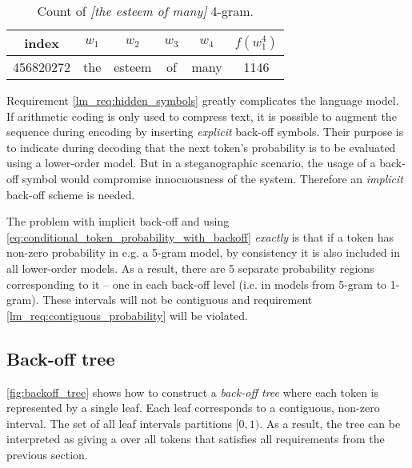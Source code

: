 \documentclass[draft]{IIBproject}
\makeatletter
\newcommand*{\eg}{e.g.\@\xspace}
\newcommand*{\ie}{i.e.\@\xspace}
\DeclareRobustCommand*{\AbbreviationWithDot}[1]{\@ifnextchar{.}{#1}{#1.\@\xspace}}
\DeclareRobustCommand*{\pmf}{\AbbreviationWithDot{p.m.f}}
\DeclareRobustCommand{\ngram}[1]{\emph{[#1]}}
\makeatother
\begin{document}
\begin{table}[h]
	\centering
	\begin{tabular}{c | *{4}{| c} || c}
	index & $w_1$ & $w_2$ & $w_3$ & $w_4$ & $f(w_1^4)$ \\
	\hline
	\num{456820272} & the & esteem & of & many & 1146
	\end{tabular}
	\caption{\label{tab:the_esteem_of_many}Count of \ngram{the esteem of many} 4-gram.}
\end{table}

Requirement \ref{lm_req:hidden_symbols} greatly complicates the language model. If arithmetic coding is only used to compress text, it is possible to augment the sequence during encoding by inserting \emph{explicit} back-off symbols. Their purpose is to indicate during decoding that the next token's probability is to be evaluated using a lower-order model. But in a steganographic scenario, the usage of a back-off symbol would compromise innocuousness of the system. Therefore an \emph{implicit} back-off scheme is needed.

The problem with implicit back-off and using \cref{eq:conditional_token_probability_with_backoff} \emph{exactly} is that if a token has non-zero probability in \eg a 5-gram model, by consistency it is also included in all lower-order models. As a result, there are 5 separate probability regions corresponding to it -- one in each back-off level (\ie in models from 5-gram to 1-gram). These intervals will not be contiguous and requirement \ref{lm_req:contiguous_probability} will be violated.

\subsection{Back-off tree}

\cref{fig:backoff_tree} shows how to construct a \emph{back-off tree} where each token is represented by a single leaf. Each leaf corresponds to a contiguous, non-zero interval. The set of all leaf intervals partitions $[0,1)$. As a result, the tree can be interpreted as giving a \pmf over all tokens that satisfies all requirements from the previous section.

\newlength{\vertexSize}
\setlength{\vertexSize}{10 pt}

\end{document}
